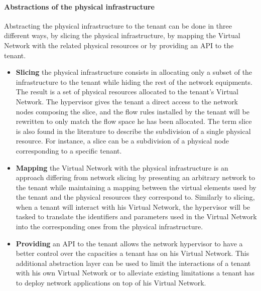\paragraph{Abstractions of the physical infrastructure}
Abstracting the physical infrastructure to the tenant can be done in three different ways, by slicing the physical infrastructure, by mapping the Virtual Network with the related physical resources or by providing an API to the tenant.
\begin{itemize}
    \item 
\textbf{Slicing} the physical infrastructure
\cite{FlowVisor-Sherwood2009}
consists in allocating only a subset of the infrastructure to the tenant while hiding the rest of the network equipments.
The result is a set of physical resources allocated to the tenant's Virtual Network.
The hypervisor gives the tenant a direct access to the network nodes composing the slice, and the flow rules installed by the tenant will be rewritten to only match the flow space he has been allocated.
The term slice is also found in the literature to describe the subdivision of a single physical resource. For instance, a slice can be a subdivision of a physical node corresponding to a specific tenant.

\item \textbf{Mapping} the Virtual Network with the physical infrastructure is an approach differing from network slicing by presenting an arbitrary network to the tenant while maintaining a mapping between the virtual elements used by the tenant and the physical resources they correspond to.
Similarly to slicing, when a tenant will interact with his Virtual Network, the hypervisor will be tasked to translate the identifiers and parameters used in the Virtual Network into the corresponding ones from the physical infrastructure.

\item \textbf{Providing} an API to the tenant allows the network hypervisor to have a better control over the capacities a tenant has on his Virtual Network. This additional abstraction layer can be used to limit the interactions of a tenant with his own Virtual Network or to alleviate existing limitations a tenant has to deploy network applications on top of his Virtual Network. 

\end{itemize}

